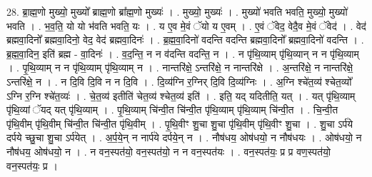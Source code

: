 \documentclass[17pt]{extarticle}
\begin{document}
28. ब्रा॒ह्म॒णो मुख्यो॒ मुख्यो᳚ ब्राह्म॒णो ब्रा᳚ह्म॒णो मुख्यः॑ । . मुख्यो॒ मुख्यः॑ । . मुख्यो॑ भवति भवति॒ मुख्यो॒ मुख्यो॑ भवति । . भ॒व॒ति॒ यो यो भ॑वति भवति॒ यः । . य ए॒व मे॒वं ॅयो य ए॒वम् । . ए॒वं ॅवेद॒ वेदै॒व मे॒वं ॅवेद॑ । . वेद॑ ब्रह्मवा॒दिनो᳚ ब्रह्मवा॒दिनो॒ वेद॒ वेद॑ ब्रह्मवा॒दिनः॑ । . ब्र॒ह्म॒वा॒दिनो॑ वदन्ति वदन्ति ब्रह्मवा॒दिनो᳚ ब्रह्मवा॒दिनो॑ वदन्ति । . ब्र॒ह्म॒वा॒दिन॒ इति॑ ब्रह्म - वा॒दिनः॑ । . व॒द॒न्ति॒ न न व॑दन्ति वदन्ति॒ न । . न पृ॑थि॒व्याम् पृ॑थि॒व्यान् न न पृ॑थि॒व्याम् । . पृ॒थि॒व्याम् न न पृ॑थि॒व्याम् पृ॑थि॒व्याम् न । . नान्तरि॑क्षे॒ ऽन्तरि॑क्षे॒ न नान्तरि॑क्षे । . अ॒न्तरि॑क्षे॒ न नान्तरि॑क्षे॒ ऽन्तरि॑क्षे॒ न । . न दि॒वि दि॒वि न न दि॒वि । . दि॒व्य॑ग्नि र॒ग्निर् दि॒वि दि॒व्य॑ग्निः । . अ॒ग्नि श्चे॑त॒व्य॑ श्चेत॒व्यो᳚ ऽग्नि र॒ग्नि श्चे॑त॒व्यः॑ । . चे॒त॒व्य॑ इतीति॑ चेत॒व्य॑ श्चेत॒व्य॑ इति॑ । . इति॒ यद् यदितीति॒ यत् । . यत् पृ॑थि॒व्याम् पृ॑थि॒व्यां ॅयद् यत् पृ॑थि॒व्याम् । . पृ॒थि॒व्याम् चि॑न्वी॒त चि॑न्वी॒त पृ॑थि॒व्याम् पृ॑थि॒व्याम् चि॑न्वी॒त । . चि॒न्वी॒त पृ॑थि॒वीम् पृ॑थि॒वीम् चि॑न्वी॒त चि॑न्वी॒त पृ॑थि॒वीम् । . पृ॒थि॒वीꣳ शु॒चा शु॒चा पृ॑थि॒वीम् पृ॑थि॒वीꣳ शु॒चा । . शु॒चा ऽर्प॑ये दर्पये च्छु॒चा शु॒चा ऽर्प॑येत् । . अ॒र्प॒ये॒न् न नार्प॑ये दर्पये॒न् न । . नौष॑धय॒ ओष॑धयो॒ न नौष॑धयः । . ओष॑धयो॒ न नौष॑धय॒ ओष॑धयो॒ न । . न वन॒स्पत॑यो॒ वन॒स्पत॑यो॒ न न वन॒स्पत॑यः । . वन॒स्पत॑यः॒ प्र प्र वण॒स्पत॑यो॒ वन॒स्पत॑यः॒ प्र । \newline
\end{document}
